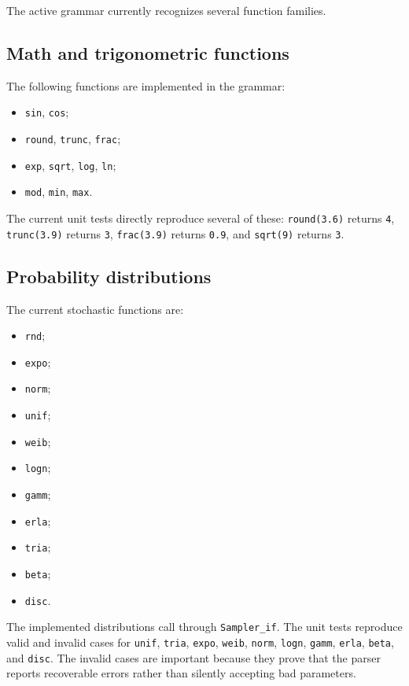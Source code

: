 The active grammar currently recognizes several function families.

\subsection{Math and trigonometric functions}
\label{subsec:expression-reference-math-trig}

The following functions are implemented in the grammar:
\begin{itemize}
\item \texttt{sin}, \texttt{cos};
\item \texttt{round}, \texttt{trunc}, \texttt{frac};
\item \texttt{exp}, \texttt{sqrt}, \texttt{log}, \texttt{ln};
\item \texttt{mod}, \texttt{min}, \texttt{max}.
\end{itemize}

The current unit tests directly reproduce several of these:
\texttt{round(3.6)} returns \texttt{4}, \texttt{trunc(3.9)} returns
\texttt{3}, \texttt{frac(3.9)} returns \texttt{0.9}, and \texttt{sqrt(9)}
returns \texttt{3}.

\subsection{Probability distributions}
\label{subsec:expression-reference-probability}

The current stochastic functions are:
\begin{itemize}
\item \texttt{rnd};
\item \texttt{expo};
\item \texttt{norm};
\item \texttt{unif};
\item \texttt{weib};
\item \texttt{logn};
\item \texttt{gamm};
\item \texttt{erla};
\item \texttt{tria};
\item \texttt{beta};
\item \texttt{disc}.
\end{itemize}

The implemented distributions call through \texttt{Sampler\_if}. The unit
tests reproduce valid and invalid cases for \texttt{unif}, \texttt{tria},
\texttt{expo}, \texttt{weib}, \texttt{norm}, \texttt{logn},
\texttt{gamm}, \texttt{erla}, \texttt{beta}, and \texttt{disc}. The invalid cases are
important because they prove that the parser reports recoverable errors rather
than silently accepting bad parameters.

